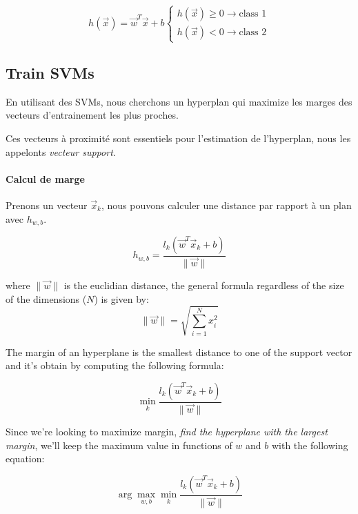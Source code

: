 \begin{equation}
	h(\vec x) = \vec w^T\vec x + b
	\begin{cases}
		h(\vec x)\geq 0\to \text{class 1} \\
		h(\vec x)< 0\to \text{class 2}
	\end{cases}
\end{equation}

\subsection{Train \gls{SVM}s}\label{subsec:train-svm}

En utilisant des \gls{SVM}s, nous cherchons un hyperplan qui maximize les marges des vecteurs d'entrainement les plus proches.

Ces vecteurs \`a proximit\'e sont essentiels pour l'estimation de l'hyperplan, nous les appelonts \textit{vecteur support}.

\paragraph{Calcul de marge}

Prenons un vecteur $\vec x_k$, nous pouvons calculer une distance par rapport \`a un plan avec $h_{w,b}$.

\begin{equation}
	h_{w, b} = \frac{l_k(\vec w^T\vec x_k + b)}{\lVert \vec w \rVert}
\end{equation}

where $\lVert \vec w \rVert$ is the euclidian distance, the general formula regardless of the size of the dimensions ($N$) is given by:
\begin{equation}
	\lVert \vec w \rVert = \sqrt{\sum_{i=1}^N x_i^2}
\end{equation}

The margin of an hyperplane is the smallest distance to one of the support vector and it's obtain by computing the following formula:

\begin{equation}
	\min_k \frac{l_k(\vec w^T\vec x_k + b)}{\lVert \vec w \rVert}
\end{equation}

Since we're looking to maximize margin, \textit{find the hyperplane with the largest margin}, we'll keep the maximum value in functions of $w$ and $b$ with the following equation:

\begin{equation}
	\arg\max_{w,b}\min_k \frac{l_k(\vec w^T\vec x_k + b)}{\lVert \vec w \rVert}
\end{equation}

